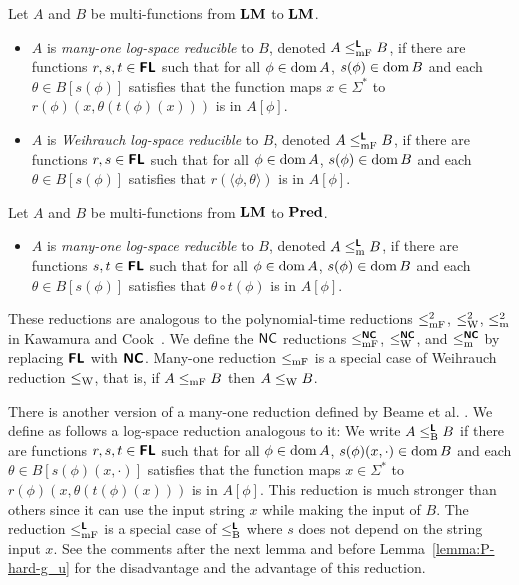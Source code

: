 \documentclass[envcountsame,orivec,oribibl]{llncs}
\begin{document}
\begin{definition}
Let $A$ and $B$ be multi-functions from $\mathbf{LM}$ to $\mathbf{LM}$.
\begin{itemize}
 \item $A$ is \emph{many-one log-space reducible} to $B$, 
       denoted $A \leq _{\mathrm{mF}} ^{\text{\bfseries \sffamily \upshape L}} B$,
       if there are functions $r, s, t \in \text{\bfseries \sffamily \upshape FL}$ such that 
       for all $\phi \in \mathop{\rm dom} A$,
       $s(\phi) \in \mathop{\rm dom} B$ and each $\theta \in B[s(\phi)]$ satisfies that
       the function maps $x \in \Sigma^*$ to $r(\phi)(x, \theta(t(\phi)(x)))$
       is in $A[\phi]$.
 \item $A$ is \emph{Weihrauch log-space reducible} to $B$,
       denoted $A \leq _{\mathrm{mF}} ^{\text{\bfseries \sffamily \upshape L}} B$,
       if there are functions $r, s \in \text{\bfseries \sffamily \upshape FL}$ such that 
       for all $\phi \in \mathop{\rm dom} A$,
       $s(\phi) \in \mathop{\rm dom} B$ and each $\theta \in B[s(\phi)]$ satisfies that
       $r(\langle \phi, \theta \rangle)$ is in $A[\phi]$.
\end{itemize}
Let $A$ and $B$ be multi-functions from $\mathbf{LM}$ to $\mathbf{Pred}$.
\begin{itemize}
 \item $A$ is \emph{many-one log-space reducible} to $B$, denoted 
       $A \leq _{\mathrm{m}} ^{\text{\bfseries \sffamily \upshape L}} B$, if there are functions $s, t \in \text{\bfseries \sffamily \upshape FL}$ such that 
       for all $\phi \in \mathop{\rm dom} A$, $s(\phi) \in \mathop{\rm dom} B$ and each 
       $\theta \in B[s(\phi)]$ satisfies that $\theta \circ t(\phi)$ is in $A[\phi]$.
\end{itemize} 
\end{definition}

These reductions are analogous to the polynomial-time reductions 
$\leq _{\mathrm{mF}}^2$, $\leq _{\mathrm W}^2$, $\leq _{\mathrm{m}}^2$ in Kawamura and Cook~\cite{kawamura2012complexity}.
We define the $\mathsf{NC}$ reductions $\leq _{\mathrm{mF}}^{\text{\bfseries \sffamily \upshape NC}}$, $\leq _{\mathrm W}^{\text{\bfseries \sffamily \upshape NC}}$,
and $\leq _{\mathrm{m}}^{\text{\bfseries \sffamily \upshape NC}}$ by replacing $\text{\bfseries \sffamily \upshape FL}$ with $\text{\bfseries \sffamily \upshape NC}$.
Many-one reduction $\leq _{\mathrm{mF}}$ is a special case of Weihrauch reduction $\leq _{\mathrm W}$,
that is, if $A \leq _{\mathrm{mF}} B$ then $A \leq _{\mathrm W} B$.

There is another version of a many-one reduction defined by
Beame et al. \cite{beame1995relative}.
We define as follows a log-space reduction analogous to it:
We write $A \leq _{\mathrm B} ^{\text{\bfseries \sffamily \upshape L}} B$ 
if there are functions $r, s, t \in \text{\bfseries \sffamily \upshape FL}$ such that 
for all $\phi \in \mathop{\rm dom} A$,
$s(\phi)(x, \cdot) \in \mathop{\rm dom} B$ and each $\theta \in B[s(\phi)(x, \cdot)]$ 
satisfies that the function maps $x \in \Sigma^*$ 
to $r(\phi)(x, \theta(t(\phi)(x)))$ is in $A[\phi]$.
This reduction is much stronger than others since
it can use the input string $x$ while making the input of $B$.
The reduction $\leq _{\mathrm{mF}} ^{\text{\bfseries \sffamily \upshape L}}$ is a special case of $\leq _{\mathrm B} ^{\text{\bfseries \sffamily \upshape L}}$ where
$s$ does not depend on the string input $x$.
See the comments after the next lemma and before Lemma~\ref{lemma:P-hard-g_u} for
the disadvantage and the advantage of this reduction.
\end{document}
